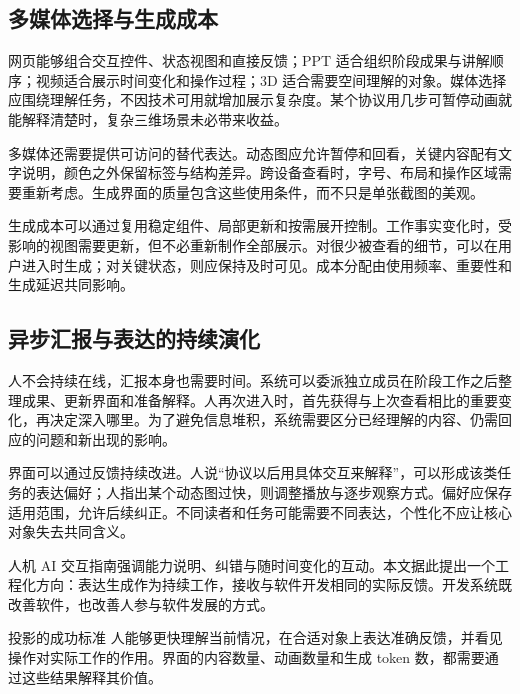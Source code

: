 \subsection{多媒体选择与生成成本}
网页能够组合交互控件、状态视图和直接反馈；PPT 适合组织阶段成果与讲解顺序；视频适合展示时间变化和操作过程；3D 适合需要空间理解的对象。媒体选择应围绕理解任务，不因技术可用就增加展示复杂度。某个协议用几步可暂停动画就能解释清楚时，复杂三维场景未必带来收益。

多媒体还需要提供可访问的替代表达。动态图应允许暂停和回看，关键内容配有文字说明，颜色之外保留标签与结构差异。跨设备查看时，字号、布局和操作区域需要重新考虑。生成界面的质量包含这些使用条件，而不只是单张截图的美观。

生成成本可以通过复用稳定组件、局部更新和按需展开控制。工作事实变化时，受影响的视图需要更新，但不必重新制作全部展示。对很少被查看的细节，可以在用户进入时生成；对关键状态，则应保持及时可见。成本分配由使用频率、重要性和生成延迟共同影响。

\subsection{异步汇报与表达的持续演化}
人不会持续在线，汇报本身也需要时间。系统可以委派独立成员在阶段工作之后整理成果、更新界面和准备解释。人再次进入时，首先获得与上次查看相比的重要变化，再决定深入哪里。为了避免信息堆积，系统需要区分已经理解的内容、仍需回应的问题和新出现的影响。

界面可以通过反馈持续改进。人说“协议以后用具体交互来解释”，可以形成该类任务的表达偏好；人指出某个动态图过快，则调整播放与逐步观察方式。偏好应保存适用范围，允许后续纠正。不同读者和任务可能需要不同表达，个性化不应让核心对象失去共同含义。

人机 AI 交互指南强调能力说明、纠错与随时间变化的互动\cite{amershi2019}。本文据此提出一个工程化方向：表达生成作为持续工作，接收与软件开发相同的实际反馈。开发系统既改善软件，也改善人参与软件发展的方式。

\begin{insight}{投影的成功标准}
人能够更快理解当前情况，在合适对象上表达准确反馈，并看见操作对实际工作的作用。界面的内容数量、动画数量和生成 token 数，都需要通过这些结果解释其价值。
\end{insight}
